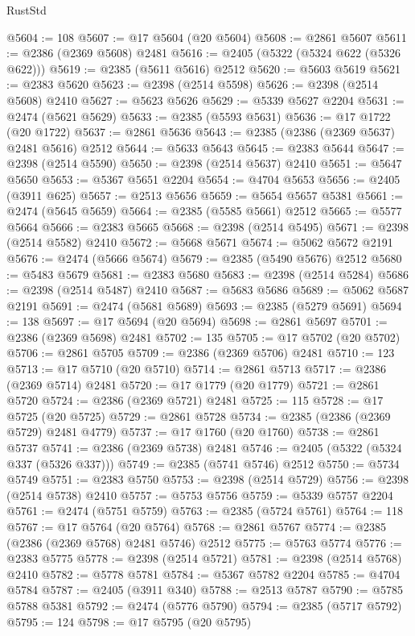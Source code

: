 \begin{lexlean}{RustStd}
\begin{coremodule}
{\begin{coremodule}
{{{{{{{{{{{{{{{{{{{{{{{{{{{{{{{{{{{{{{{{{{{{{{{{{{@5604 := 108
@5607 := @17 @5604 (@20 @5604)
@5608 := @2861 @5607
@5611 := @2386 (@2369 @5608) @2481
@5616 := @2405 (@5322 (@5324 @622 (@5326 @622)))
@5619 := @2385 (@5611 @5616) @2512
@5620 := @5603 @5619
@5621 := @2383 @5620
@5623 := @2398 (@2514 @5598)
@5626 := @2398 (@2514 @5608) @2410
@5627 := @5623 @5626
@5629 := @5339 @5627 @2204
@5631 := @2474 (@5621 @5629)
@5633 := @2385 (@5593 @5631)
@5636 := @17 @1722 (@20 @1722)
@5637 := @2861 @5636
@5643 := @2385 (@2386 (@2369 @5637) @2481 @5616) @2512
@5644 := @5633 @5643
@5645 := @2383 @5644
@5647 := @2398 (@2514 @5590)
@5650 := @2398 (@2514 @5637) @2410
@5651 := @5647 @5650
@5653 := @5367 @5651 @2204
@5654 := @4704 @5653
@5656 := @2405 (@3911 @625)
@5657 := @2513 @5656
@5659 := @5654 @5657 @5381
@5661 := @2474 (@5645 @5659)
@5664 := @2385 (@5585 @5661) @2512
@5665 := @5577 @5664
@5666 := @2383 @5665
@5668 := @2398 (@2514 @5495)
@5671 := @2398 (@2514 @5582) @2410
@5672 := @5668 @5671
@5674 := @5062 @5672 @2191
@5676 := @2474 (@5666 @5674)
@5679 := @2385 (@5490 @5676) @2512
@5680 := @5483 @5679
@5681 := @2383 @5680
@5683 := @2398 (@2514 @5284)
@5686 := @2398 (@2514 @5487) @2410
@5687 := @5683 @5686
@5689 := @5062 @5687 @2191
@5691 := @2474 (@5681 @5689)
@5693 := @2385 (@5279 @5691)
@5694 := 138
@5697 := @17 @5694 (@20 @5694)
@5698 := @2861 @5697
@5701 := @2386 (@2369 @5698) @2481
@5702 := 135
@5705 := @17 @5702 (@20 @5702)
@5706 := @2861 @5705
@5709 := @2386 (@2369 @5706) @2481
@5710 := 123
@5713 := @17 @5710 (@20 @5710)
@5714 := @2861 @5713
@5717 := @2386 (@2369 @5714) @2481
@5720 := @17 @1779 (@20 @1779)
@5721 := @2861 @5720
@5724 := @2386 (@2369 @5721) @2481
@5725 := 115
@5728 := @17 @5725 (@20 @5725)
@5729 := @2861 @5728
@5734 := @2385 (@2386 (@2369 @5729) @2481 @4779)
@5737 := @17 @1760 (@20 @1760)
@5738 := @2861 @5737
@5741 := @2386 (@2369 @5738) @2481
@5746 := @2405 (@5322 (@5324 @337 (@5326 @337)))
@5749 := @2385 (@5741 @5746) @2512
@5750 := @5734 @5749
@5751 := @2383 @5750
@5753 := @2398 (@2514 @5729)
@5756 := @2398 (@2514 @5738) @2410
@5757 := @5753 @5756
@5759 := @5339 @5757 @2204
@5761 := @2474 (@5751 @5759)
@5763 := @2385 (@5724 @5761)
@5764 := 118
@5767 := @17 @5764 (@20 @5764)
@5768 := @2861 @5767
@5774 := @2385 (@2386 (@2369 @5768) @2481 @5746) @2512
@5775 := @5763 @5774
@5776 := @2383 @5775
@5778 := @2398 (@2514 @5721)
@5781 := @2398 (@2514 @5768) @2410
@5782 := @5778 @5781
@5784 := @5367 @5782 @2204
@5785 := @4704 @5784
@5787 := @2405 (@3911 @340)
@5788 := @2513 @5787
@5790 := @5785 @5788 @5381
@5792 := @2474 (@5776 @5790)
@5794 := @2385 (@5717 @5792)
@5795 := 124
@5798 := @17 @5795 (@20 @5795)
}}}}}}}}}}}}}}}}}}}}}}}}}}}}}}}}}}}}}}}}}}}}}}}}}}
\end{coremodule}}
\end{coremodule}
\end{lexlean}

